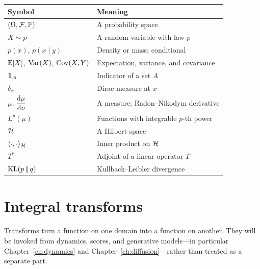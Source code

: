 \begin{table}[htbp]
\centering
{}
\label{tab:notation-probability}
\begin{tabular}{@{}ll@{}}
\toprule
Symbol & Meaning \\
\midrule
$(\Omega,\mathcal{F},\mathbb{P})$ & A probability space \\
$X\sim p$ & A random variable with law $p$ \\
$p(x)$, $p(x\mid y)$ & Density or mass; conditional \\
$\mathbb{E}[X]$, $\mathrm{Var}(X)$, $\mathrm{Cov}(X,Y)$ & Expectation, variance, and covariance \\
$\mathbf{1}_A$ & Indicator of a set $A$ \\
$\delta_x$ & Dirac measure at $x$ \\
$\mu$, $\dfrac{\mathrm{d}\mu}{\mathrm{d}\nu}$ & A measure; Radon--Nikodym derivative \\
$L^p(\mu)$ & Functions with integrable $p$-th power \\
$\mathcal{H}$ & A Hilbert space \\
$\langle\cdot,\cdot\rangle_{\mathcal{H}}$ & Inner product on $\mathcal{H}$ \\
$T^{*}$ & Adjoint of a linear operator $T$ \\
$\mathrm{KL}(p\,\|\,q)$ & Kullback--Leibler divergence \\
\bottomrule
\end{tabular}
\end{table}

\section*{Integral transforms}
\label{not:transforms}

Transforms turn a function on one domain into a function on another. They will be invoked from dynamics, scores, and generative models---in particular Chapter~\ref{ch:dynamics} and Chapter~\ref{ch:diffusion}---rather than treated as a separate part.

